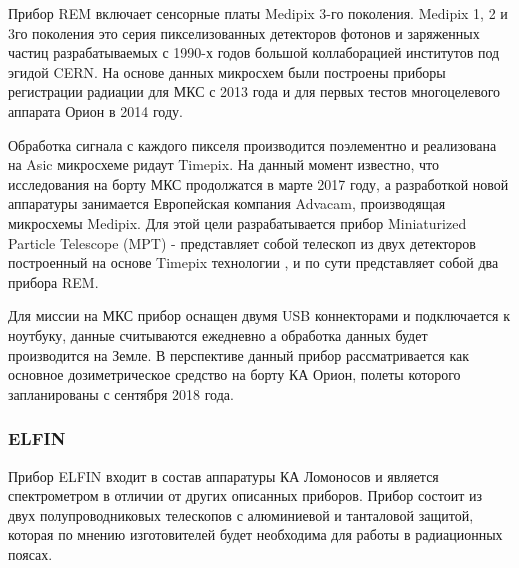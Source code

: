 Прибор REM включает сенсорные платы Medipix 3-го поколения. Medipix 1, 2 и 3го поколения это серия пикселизованных детекторов фотонов и заряженных частиц разрабатываемых с 1990-х годов большой коллаборацией институтов под эгидой CERN. На основе данных микросхем были построены приборы регистрации радиации для МКС с 2013 года и для первых тестов многоцелевого аппарата Орион в 2014 году.

Обработка сигнала с каждого пикселя производится поэлементно и реализована на Asic микросхеме ридаут Timepix. На данный момент известно, что исследования на борту МКС продолжатся в марте 2017 году, а разработкой новой аппаратуры занимается Европейская компания Advacam, производящая микросхемы Medipix. Для этой цели разрабатывается прибор Miniaturized Particle Telescope (MPT)\cite{Fry2016} - представляет собой телескоп из двух детекторов построенный на основе Timepix технологии \cite{Kroupa2015}, и по сути представляет собой два прибора REM. 

Для миссии на МКС прибор оснащен двумя USB коннекторами и подключается к ноутбуку, данные считываются ежедневно а обработка данных будет производится на Земле. В перспективе данный прибор рассматривается как основное дозиметрическое средство на борту КА Орион, полеты которого запланированы с сентября 2018 года.


\subsubsection{ELFIN}
Прибор ELFIN входит в состав аппаратуры КА Ломоносов и является спектрометром в отличии от других описанных приборов. Прибор состоит из двух полупроводниковых телескопов с алюминиевой и танталовой защитой, которая по мнению изготовителей будет необходима для работы в радиационных поясах.\cite{VassilisAngelopoulos}

